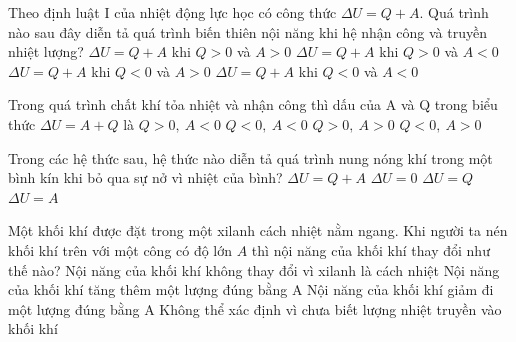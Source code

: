 \begin{ex}
	Theo định luật I của nhiệt động lực học có công thức $\Delta U = Q + A$. Quá trình nào sau đây diễn tả quá trình biến thiên nội năng khi hệ nhận công và truyền nhiệt lượng?
	\choice
	{$\Delta U = Q + A$ khi $Q > 0$ và $A > 0$}
	{$\Delta U = Q + A$ khi $Q > 0$ và $A < 0$}
	{\True $\Delta U = Q + A$ khi $Q < 0$ và $A > 0$}
	{$\Delta U = Q + A$ khi $Q < 0$ và $A < 0$}
\end{ex}
\begin{ex}%
	Trong quá trình chất khí tỏa nhiệt và nhận công thì dấu của A và Q trong biểu thức $\Delta U = A+Q$ là
	\choice
	{$Q > 0,\ A < 0$}
	{$Q < 0,\ A < 0$}
	{$Q > 0,\ A > 0$}
	{\True $Q < 0,\ A > 0$}
	\end{ex}
\begin{ex}%
	Trong các hệ thức sau, hệ thức nào diễn tả quá trình nung nóng khí trong một bình kín khi bỏ qua sự nở vì nhiệt của bình?
	\choice
	{$\Delta U = Q + A$}
	{$\Delta U = 0$}
	{\True $\Delta U = Q$}
	{$\Delta U = A$}
	
	\end{ex}					\begin{ex} 
	Một khối khí được đặt trong một xilanh cách nhiệt nằm ngang. Khi người ta nén khối khí trên với một công có độ lớn $A$ thì nội năng của khối khí thay đổi như thế nào?
	\choice
	{Nội năng của khối khí không thay đổi vì xilanh là cách nhiệt}
	{\True Nội năng của khối khí tăng thêm một lượng đúng bằng A}
	{Nội năng của khối khí giảm đi một lượng đúng bằng A}
	{Không thể xác định vì chưa biết lượng nhiệt truyền vào khối khí}
\end{ex}

